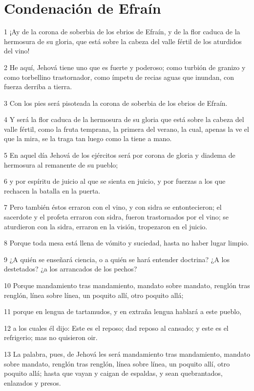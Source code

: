 \section*{Condenación de Efraín}

\par 1 ¡Ay de la corona de soberbia de los ebrios de Efraín, y de la flor caduca de la hermosura de su gloria, que está sobre la cabeza del valle fértil de los aturdidos del vino!
\par 2 He aquí, Jehová tiene uno que es fuerte y poderoso; como turbión de granizo y como torbellino trastornador, como ímpetu de recias aguas que inundan, con fuerza derriba a tierra.
\par 3 Con los pies será pisoteada la corona de soberbia de los ebrios de Efraín.
\par 4 Y será la flor caduca de la hermosura de su gloria que está sobre la cabeza del valle fértil, como la fruta temprana, la primera del verano, la cual, apenas la ve el que la mira, se la traga tan luego como la tiene a mano.
\par 5 En aquel día Jehová de los ejércitos será por corona de gloria y diadema de hermosura al remanente de su pueblo;
\par 6 y por espíritu de juicio al que se sienta en juicio, y por fuerzas a los que rechacen la batalla en la puerta.
\par 7 Pero también éstos erraron con el vino, y con sidra se entontecieron; el sacerdote y el profeta erraron con sidra, fueron trastornados por el vino; se aturdieron con la sidra, erraron en la visión, tropezaron en el juicio.
\par 8 Porque toda mesa está llena de vómito y suciedad, hasta no haber lugar limpio.
\par 9 ¿A quién se enseñará ciencia, o a quién se hará entender doctrina? ¿A los destetados? ¿a los arrancados de los pechos?
\par 10 Porque mandamiento tras mandamiento, mandato sobre mandato, renglón tras renglón, línea sobre línea, un poquito allí, otro poquito allá;
\par 11 porque en lengua de tartamudos, y en extraña lengua hablará a este pueblo,
\par 12 a los cuales él dijo: Este es el reposo; dad reposo al cansado; y este es el refrigerio; mas no quisieron oir. 
\par 13 La palabra, pues, de Jehová les será mandamiento tras mandamiento, mandato sobre mandato, renglón tras renglón, línea sobre línea, un poquito allí, otro poquito allá; hasta que vayan y caigan de espaldas, y sean quebrantados, enlazados y presos.

